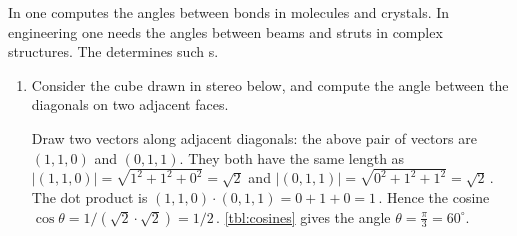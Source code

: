 \begin{example} 
In  one computes the angles between bonds in molecules and crystals.  
In engineering one needs the angles between beams and struts in complex structures.
The  determines such s.
\begin{enumerate}
\item Consider the cube drawn in stereo below, and compute the angle between the diagonals on two adjacent faces.
\begin{center}
 {}
\end{center}
\begin{solution} 
Draw two vectors along adjacent diagonals: the above pair of vectors are \((1,1,0)\) and \((0,1,1)\).
They both have the same length as \(|(1,1,0)|=\sqrt{1^2+1^2+0^2}=\sqrt2\) and \(|(0,1,1)|=\sqrt{0^2+1^2+1^2}=\sqrt2\)\,.
The dot product is \((1,1,0)\cdot(0,1,1)=0+1+0=1\)\,.
Hence the cosine \(\cos\theta=1/(\sqrt2\cdot\sqrt2)=1/2\)\,.
\cref{tbl:cosines} gives the angle \(\theta=\frac\pi3=60^\circ\).
\end{solution}


\end{enumerate}
\end{example}

